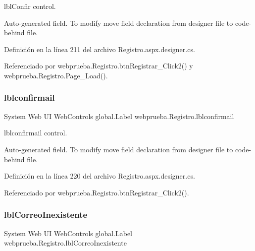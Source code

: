 lbl\+Confir control. 

Auto-\/generated field. To modify move field declaration from designer file to code-\/behind file. 

Definición en la línea 211 del archivo Registro.\+aspx.\+designer.\+cs.



Referenciado por webprueba.\+Registro.\+btn\+Registrar\+\_\+\+Click2() y webprueba.\+Registro.\+Page\+\_\+\+Load().

\mbox{\label{classwebprueba_1_1_registro_ace388583f32ec34c02d40b9d43db2112}} 
\subsubsection{\texorpdfstring{lblconfirmail}{lblconfirmail}}
{\footnotesize\ttfamily System Web UI Web\+Controls global.\+Label webprueba.\+Registro.\+lblconfirmail\hspace{0.3cm}{\ttfamily [protected]}}



lblconfirmail control. 

Auto-\/generated field. To modify move field declaration from designer file to code-\/behind file. 

Definición en la línea 220 del archivo Registro.\+aspx.\+designer.\+cs.



Referenciado por webprueba.\+Registro.\+btn\+Registrar\+\_\+\+Click2().

\mbox{\label{classwebprueba_1_1_registro_a3d93b0b966ee57fd016644ade25ec339}} 
\subsubsection{\texorpdfstring{lblCorreoInexistente}{lblCorreoInexistente}}
{\footnotesize\ttfamily System Web UI Web\+Controls global.\+Label webprueba.\+Registro.\+lbl\+Correo\+Inexistente\hspace{0.3cm}{\ttfamily [protected]}}



